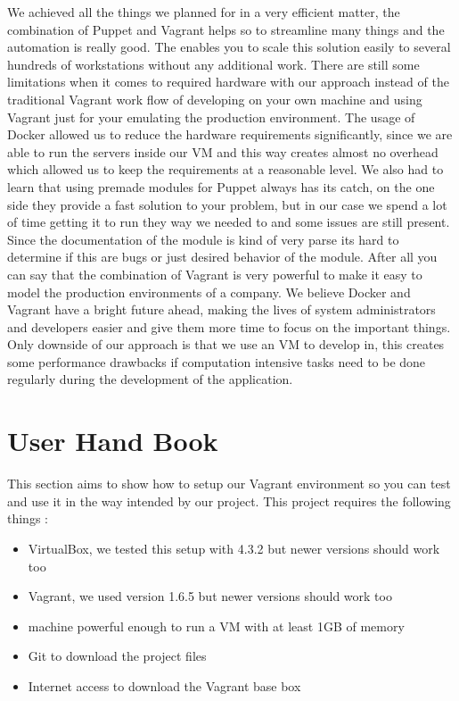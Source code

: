 We achieved all the things we planned for in a very efficient matter, the combination of Puppet and Vagrant helps so to streamline many things and the automation is really good. The enables you to scale this solution easily to several hundreds of workstations without any additional work. There are still some limitations when it comes to required hardware with our approach instead of the traditional Vagrant work flow of developing on your own machine and using Vagrant just for your emulating the production environment. The usage of Docker allowed us to reduce the hardware requirements significantly, since we are able to run the servers inside our \gls{VM} and this way creates almost no overhead which allowed us to keep the requirements at a reasonable level. We also had to learn that using premade modules for Puppet always has its catch, on the one side they provide a fast solution to your problem, but in our case we spend a lot of time getting it to run they way we needed to and some issues are still present. Since the documentation of the module is kind of very parse its hard to determine if this are bugs or just desired behavior of the module. 
After all you can say that the combination of Vagrant is very powerful to make it easy to model the production environments of a company. We believe Docker and Vagrant have a bright future ahead, making the lives of system administrators and developers easier and give them more time to focus on the important things. Only downside of our approach is that we use an \gls{VM} to develop in, this creates some performance drawbacks if computation intensive tasks need to be done regularly during the development of the application.

\section{User Hand Book}

This section aims to show how to setup our Vagrant environment so you can test and use it in the way intended by our project.
This project requires the following things :
\begin{itemize}
\item VirtualBox, we tested this setup with 4.3.2 but newer versions should work too
\item Vagrant, we used version 1.6.5 but newer versions should work too
\item machine powerful enough to run a \gls{VM} with at least 1GB of memory
\item Git to download the project files
\item Internet access to download the Vagrant base \gls{box}
\end{itemize}


